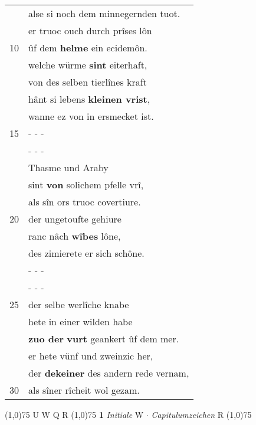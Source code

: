 \documentclass[8pt,a4paper,notitlepage]{article}
\begin{document}
\begin{table}[ht]
\begin{minipage}[t]{0.5\linewidth}
\begin{tabular}{rl}
 & alse si noch dem minnegernden tuot.\\ 
 & er truoc ouch durch prîses lôn\\ 
10 & ûf dem \textbf{helme} ein ecidemôn.\\ 
 & welche würme \textbf{sint} eiterhaft,\\ 
 & von des selben tierlînes kraft\\ 
 & hânt si lebens \textbf{kleinen vrist},\\ 
 & wanne ez von in ersmecket ist.\\ 
15 & \multicolumn{1}{l}{ - - - }\\ 
 & \multicolumn{1}{l}{ - - - }\\ 
 & Thasme und Araby\\ 
 & sint \textbf{von} solichem pfelle vrî,\\ 
 & als sîn ors truoc covertiure.\\ 
20 & der ungetoufte gehiure\\ 
 & ranc nâch \textbf{wîbes} lône,\\ 
 & des zimierete er sich schône.\\ 
 & \multicolumn{1}{l}{ - - - }\\ 
 & \multicolumn{1}{l}{ - - - }\\ 
25 & der selbe werlîche knabe\\ 
 & hete in einer wilden habe\\ 
 & \textbf{zuo der} \textbf{vurt} geankert ûf dem mer.\\ 
 & er hete vünf und zweinzic her,\\ 
 & der \textbf{dekeiner} des andern rede vernam,\\ 
30 & als sîner rîcheit wol gezam.\\ 
\end{tabular}
\scriptsize
\line(1,0){75} \newline
U W Q R \newline
\line(1,0){75} \newline
\textbf{1} \textit{Initiale} W   $\cdot$ \textit{Capitulumzeichen} R  \newline
\line(1,0){75} \newline

\end{minipage}
\end{table}
\end{document}
